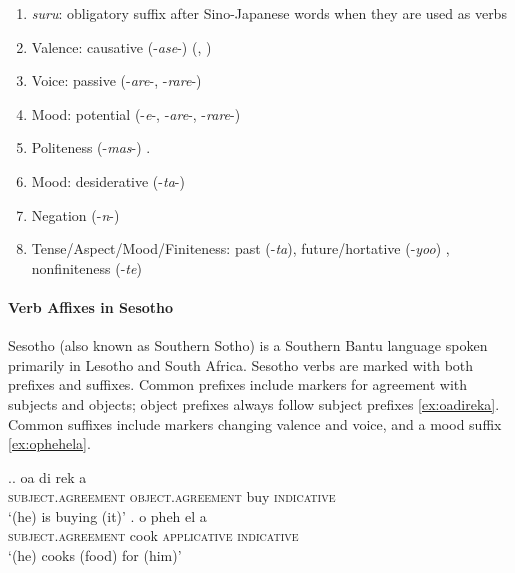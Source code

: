 \begin{enumerate}
\item \textit{suru}: obligatory suffix after Sino-Japanese words when they are used as verbs
\item Valence: causative (-\textit{ase}-) (\citet[142]{hasegawa2014japanese}, \citet[Chapter 13]{kaiser2013japanese})
\item Voice: passive (-\textit{are}-, -\textit{rare}-) \cite[152]{hasegawa2014japanese} \cite[Chapter 12]{kaiser2013japanese}
\item Mood: potential (-\textit{e}-, -\textit{are}-, -\textit{rare}-) \cite[398]{kaiser2013japanese}  
\item Politeness (-\textit{mas}-) \cite[190]{kaiser2013japanese}.
\item Mood: desiderative (-\textit{ta}-) \cite[238]{kaiser2013japanese}
\item Negation (-\textit{n}-)
\item Tense/Aspect/Mood/Finiteness: past (-\textit{ta}), future/hortative (-\textit{yoo}) \cite[229]{kaiser2013japanese}, nonfiniteness (-\textit{te}) \cite[186]{kaiser2013japanese}
\end{enumerate}







\paragraph{Verb Affixes in Sesotho}
Sesotho (also known as Southern Sotho) is a Southern Bantu language spoken primarily in Lesotho and South Africa.
Sesotho verbs are marked with both prefixes and suffixes.
Common prefixes include markers for agreement with subjects and objects; object prefixes always follow subject prefixes \ref{ex:oadireka}.
Common suffixes include markers changing valence and voice, and a mood suffix \ref{ex:ophehela}.

\ex.\ag. oa di rek a \\
\textsc{subject.agreement} \textsc{object.agreement} buy \textsc{indicative} \\
`(he) is buying (it)'  \cite[ex (41)]{demuth1992acquisition} \label{ex:oadireka}
\bg. o pheh el a \\
\textsc{subject.agreement} cook \textsc{applicative} \textsc{indicative} \\
`(he) cooks (food) for (him)'  \cite[ex (41)]{demuth1992acquisition}
\label{ex:ophehela}

